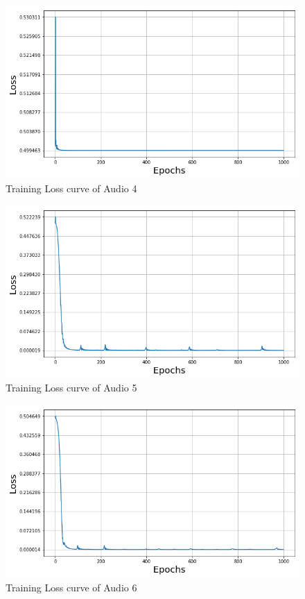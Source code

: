 \documentclass{ioereport}
\begin{document}
    \begin{figure}[H]
        \centering
        \includegraphics[width=\linewidth]{assets/audio_loss_curves/puretone5000.png}
        \caption{Training Loss curve of Audio 4}
        \label{fig:audio-loss-curve-4}
    \end{figure}
    \begin{figure}[H]
        \centering
        \includegraphics[width=\linewidth]{assets/audio_loss_curves/sweepingtone200_500.png}
        \caption{Training Loss curve of Audio 5}
        \label{fig:audio-loss-curve-5}
    \end{figure}
    \begin{figure}[H]
        \centering
        \includegraphics[width=\linewidth]{assets/audio_loss_curves/fluctuating_tone400.png}
        \caption{Training Loss curve of Audio 6}
        \label{fig:audio-loss-curve-6}
    \end{figure}
\end{document}

